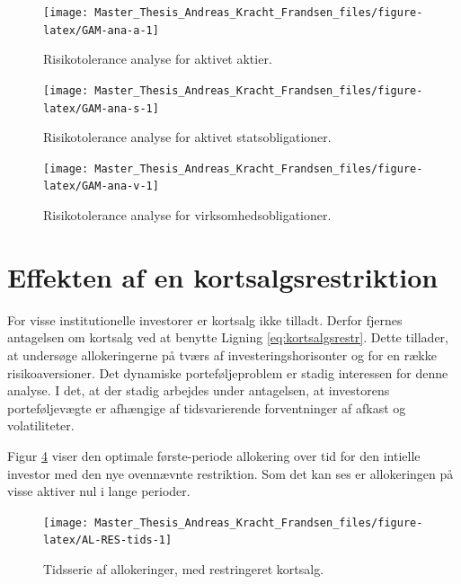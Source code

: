 \documentclass[
  a4paper,
  oneside]{memoir}
\begin{document}
\begin{figure}[H]

{\centering \texttt{[image: Master\_Thesis\_Andreas\_Kracht\_Frandsen\_files/figure-latex/GAM-ana-a-1]} 

}

\caption{Risikotolerance analyse for aktivet aktier.}\label{fig:GAM-ana-a}
\end{figure}

\begin{figure}[H]

{\centering \texttt{[image: Master\_Thesis\_Andreas\_Kracht\_Frandsen\_files/figure-latex/GAM-ana-s-1]} 

}

\caption{Risikotolerance analyse for aktivet statsobligationer.}\label{fig:GAM-ana-s}
\end{figure}

\begin{figure}[H]

{\centering \texttt{[image: Master\_Thesis\_Andreas\_Kracht\_Frandsen\_files/figure-latex/GAM-ana-v-1]} 

}

\caption{Risikotolerance analyse for virksomhedsobligationer.}\label{fig:GAM-ana-v}
\end{figure}

\hypertarget{effekten-af-en-kortsalgsrestriktion}{%
\section{Effekten af en kortsalgsrestriktion}\label{effekten-af-en-kortsalgsrestriktion}}

For visse institutionelle investorer er kortsalg ikke tilladt. Derfor fjernes antagelsen om kortsalg ved at benytte Ligning \eqref{eq:kortsalgsrestr}. Dette tillader, at undersøge allokeringerne på tværs af investeringshorisonter og for en række risikoaversioner. Det dynamiske porteføljeproblem er stadig interessen for denne analyse. I det, at der stadig arbejdes under antagelsen, at investorens porteføljevægte er afhængige af tidsvarierende forventninger af afkast og volatiliteter.

Figur \ref{fig:AL-RES-tids} viser den optimale første-periode allokering over tid for den intielle investor med den nye ovennævnte restriktion. Som det kan ses er allokeringen på visse aktiver nul i lange perioder.

\begin{figure}[H]

{\centering \texttt{[image: Master\_Thesis\_Andreas\_Kracht\_Frandsen\_files/figure-latex/AL-RES-tids-1]} 

}

\caption{Tidsserie af allokeringer, med restringeret kortsalg.}\label{fig:AL-RES-tids}
\end{figure}
\end{document}
